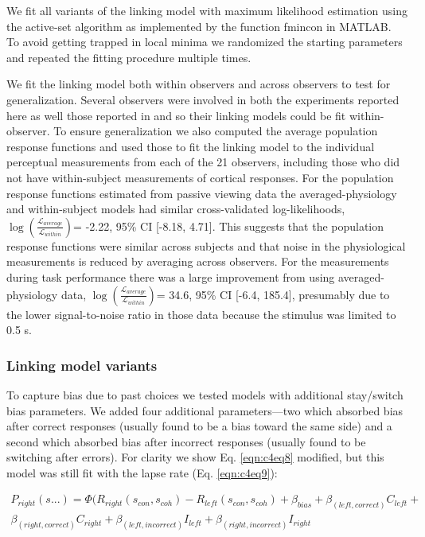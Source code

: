 We fit all variants of the linking model with maximum likelihood estimation using the active-set algorithm as implemented by the function fmincon in MATLAB. To avoid getting trapped in local minima we randomized the starting parameters and repeated the fitting procedure multiple times. 

We fit the linking model both within observers and across observers to test for generalization. Several observers were involved in both the experiments reported here as well those reported in \citet{Birman2018-sp} and so their linking models could be fit within-observer. To ensure generalization we also computed the average population response functions and used those to fit the linking model to the individual perceptual measurements from each of the 21 observers, including those who did not have within-subject measurements of cortical responses. For the population response functions estimated from passive viewing data the averaged-physiology and within-subject models had similar cross-validated log-likelihoods, $\log(\frac{\mathcal{L}_{average}}{\mathcal{L}_{within}})$= -2.22, 95\% CI [-8.18, 4.71]. This suggests that the population response functions were similar across subjects and that noise in the physiological measurements is reduced by averaging across observers.  For the measurements during task performance there was a large improvement from using averaged-physiology data, $\log(\frac{\mathcal{L}_{average}}{\mathcal{L}_{within}})$= 34.6, 95\% CI [-6.4, 185.4], presumably due to the lower signal-to-noise ratio in those data because the stimulus was limited to 0.5 s.

\subsubsection{Linking model variants}

To capture bias due to past choices \citep{Abrahamyan2016-od,Frund2016-ld} we tested models with additional stay/switch bias parameters. We added four additional parameters—two which absorbed bias after correct responses (usually found to be a bias toward the same side) and a second which absorbed bias after incorrect responses (usually found to be switching after errors). For clarity we show Eq. \ref{eqn:c4eq8} modified, but this model was still fit with the lapse rate (Eq. \ref{eqn:c4eq9}):

\begin{equation}
    \begin{aligned}
    P_{right}(s...)=\Phi(R_{right}(s_{con},s_{coh})-R_{left}(s_{con},s_{coh})+\beta_{bias}+\beta_{(left,correct)}C_{left}+ \\ \beta_{(right,correct)}C_{right}+\beta_{(left,incorrect)}I_{left}+\beta_{(right,incorrect)}I_{right}
    \end{aligned}
\end{equation}

